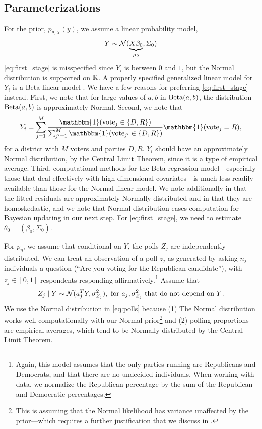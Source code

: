 \documentclass[12pt, letterpaper]{article}
\begin{document}
\subsection{Parameterizations}

For the prior, $p_{\theta, X}(y)$, we assume a linear probability model,
\begin{equation}
    Y \sim \mathcal{N}(\underbrace{X\beta_0}_{\mu_0}, \Sigma_0)
    \label{eq:first_stage}
\end{equation}
\eqref{eq:first_stage} is misspecified since $Y_i$ is between $0$ and $1$, but the Normal
distribution is supported on $\mathbb{R}$. A properly specified generalized linear model
for $Y_i$ is a Beta linear model \citep[See][for an overview]{grun2011extended}.
We have a few reasons for preferring \eqref{eq:first_stage} instead. First, we
note that for large values of $a,b$ in $\operatorname{Beta}(a,b)$, the distribution
$\operatorname{Beta}(a,b)$ is approximately Normal. Second, we note that \[Y_i =
\sum_{j=1}^M \frac{\mathbbm{1} (\text{vote}_j \in \{D,R\})}{\sum_{j'=1}^M \mathbbm{1}
(\text{vote}_{j'} \in \{D,R\})} \mathbbm{1}(\text{vote}_j = R),\] for a district with
$M$ voters and parties $D,R$. $Y_i$ should have an approximately Normal distribution, by the
Central Limit Theorem, since it is a type of empirical average. Third, computational methods for the Beta regression
model---especially those that deal effectively with high-dimensional
covariates---is much less readily available than those for the Normal linear
model. We note additionally in  that the fitted residuals are
approximately Normally distributed and in  that they are homoskedastic, and we note that Normal distribution eases
computation for Bayesian updating in our next step. For \eqref{eq:first_stage},
we need to estimate $\theta_0 = (\beta_0, \Sigma_0)$. 

For $p_{\eta}$, we assume that conditional on $Y$, the polls $Z_j$ are
independently distributed. We can treat an observation of a poll $z_j$ as
generated by
asking $n_j$
individuals a question (``Are you voting for the Republican candidate''), with
$z_j \in [0,1]$ respondents responding
affirmatively.\footnote{Again, this model assumes that the only parties running
are Republicans and Democrats, and that there are no undecided individuals.
When working with data, we normalize the Republican percentage by the sum of
the Republican and Democratic percentages.}
Assume that 
\begin{equation}
    Z_j \mid Y \sim \mathcal{N}(a_j^T Y, \sigma_{Z_j}^2), \text{ for $a_j, \sigma_
    {Z_j}^2$ that do not depend on $Y$}.
    \label{eq:polls}
\end{equation}
We use the Normal distribution in \eqref{eq:polls} because (1) The Normal
distribution works well computationally with our Normal prior\footnote{This is
assuming that the Normal likelihood has variance unaffected by the
prior---which requires a further justification that we discuss in 
.} and (2) polling proportions are empirical averages, which
tend to be Normally distributed by the Central Limit Theorem.
\end{document}
